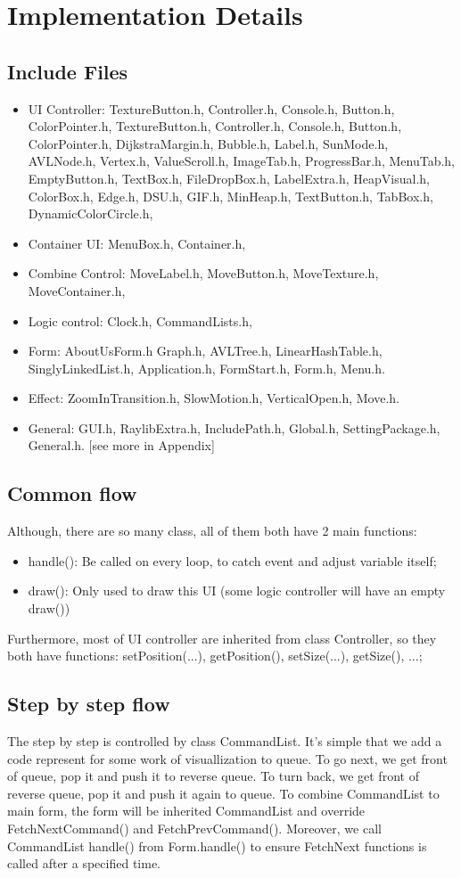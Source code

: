 \section{Implementation Details}
\subsection{Include Files}
\begin{itemize}
    \item UI Controller: 
TextureButton.h,
Controller.h,
Console.h,
Button.h,
ColorPointer.h,
TextureButton.h,
Controller.h,
Console.h,
Button.h,
ColorPointer.h,
DijkstraMargin.h,
Bubble.h,
Label.h,
SunMode.h,
AVLNode.h,
Vertex.h,
ValueScroll.h,
ImageTab.h,
ProgressBar.h,
MenuTab.h,
EmptyButton.h,
TextBox.h,
FileDropBox.h,
LabelExtra.h,
HeapVisual.h,
ColorBox.h,
Edge.h,
DSU.h,
GIF.h,
MinHeap.h,
TextButton.h,
TabBox.h,
DynamicColorCircle.h,
    \item Container UI: 
MenuBox.h,
Container.h,
    \item Combine Control: 
MoveLabel.h,
MoveButton.h,
MoveTexture.h,
MoveContainer.h,
    \item Logic control: 
Clock.h,
CommandLists.h,
    \item Form: 
AboutUsForm.h
Graph.h,
AVLTree.h,
LinearHashTable.h,
SinglyLinkedList.h,
Application.h,
FormStart.h,
Form.h,
Menu.h.
    \item Effect: 
ZoomInTransition.h,
SlowMotion.h,
VerticalOpen.h,
Move.h.
    \item General: 
GUI.h,
RaylibExtra.h,
IncludePath.h,
Global.h,
SettingPackage.h,
General.h.
[see more in Appendix]
\end{itemize}
\subsection{Common flow}
Although, there are so many class, all of them both have 2 main functions: 
\begin{itemize}
    \item handle(): Be called on every loop, to catch event and adjust variable itself;
    \item draw(): Only used to draw this UI (some logic controller will have an empty draw())
\end{itemize}
Furthermore, most of UI controller are inherited from class Controller, so they both have functions: setPosition(...), getPosition(), setSize(...), getSize(), ...;

\subsection{Step by step flow}
The step by step is controlled by class CommandList.
It's simple that we add a code represent for some work of visuallization to queue. To go next, we get front of queue, pop it and push it to reverse queue. To turn back, we get front of reverse queue, pop it and push it again to queue.
To combine CommandList to main form, the form will be inherited CommandList and override FetchNextCommand() and FetchPrevCommand().
Moreover, we call CommandList handle() from Form.handle() to ensure FetchNext functions is called after a specified time.
